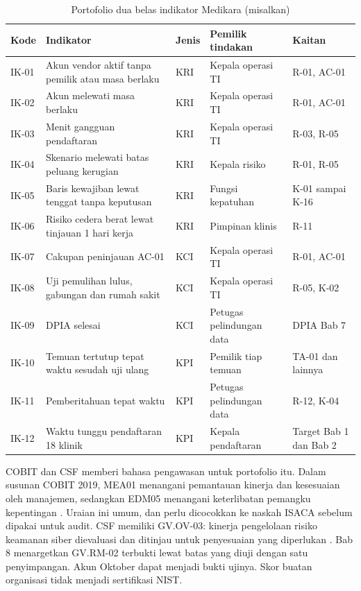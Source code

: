 \begin{table}[!htb]
  \centering\small
  \caption{Portofolio dua belas indikator Medikara (misalkan)}\label{tab:ch13-portofolio}
  \begin{tabularx}{\textwidth}{|>{\raggedright\arraybackslash}p{}|>{\raggedright\arraybackslash}X|>{\raggedright\arraybackslash}p{}|>{\raggedright\arraybackslash}p{}|>{\raggedright\arraybackslash}p{}|}
    \hline
    \textbf{Kode} & \textbf{Indikator} & \textbf{Jenis} & \textbf{Pemilik tindakan} &
    \textbf{Kaitan} \\ \hline
    IK-01 & Akun vendor aktif tanpa pemilik atau masa berlaku & KRI & Kepala operasi TI & R-01,
    AC-01 \\ \hline
    IK-02 & Akun melewati masa berlaku & KRI & Kepala operasi TI & R-01, AC-01 \\ \hline
    IK-03 & Menit gangguan pendaftaran & KRI & Kepala operasi TI & R-03, R-05 \\ \hline
    IK-04 & Skenario melewati batas peluang kerugian & KRI & Kepala risiko & R-01, R-05 \\ \hline
    IK-05 & Baris kewajiban lewat tenggat tanpa keputusan & KRI & Fungsi kepatuhan & K-01 sampai
    K-16 \\ \hline
    IK-06 & Risiko cedera berat lewat tinjauan 1 hari kerja & KRI & Pimpinan klinis & R-11 \\ \hline
    IK-07 & Cakupan peninjauan AC-01 & KCI & Kepala operasi TI & R-01, AC-01 \\ \hline
    IK-08 & Uji pemulihan lulus, gabungan dan rumah sakit & KCI & Kepala operasi TI & R-05, K-02 \\
    \hline
    IK-09 & DPIA selesai & KCI & Petugas pelindungan data & 5 DPIA Bab 7 \\ \hline
    IK-10 & Temuan tertutup tepat waktu sesudah uji ulang & KPI & Pemilik tiap temuan & TA-01 dan
    lainnya \\ \hline
    IK-11 & Pemberitahuan tepat waktu & KPI & Petugas pelindungan data & R-12, K-04 \\ \hline
    IK-12 & Waktu tunggu pendaftaran 18 klinik & KPI & Kepala pendaftaran & Target Bab 1 dan Bab 2
    \\ \hline
  \end{tabularx}
\end{table}

COBIT dan CSF memberi bahasa pengawasan untuk portofolio itu. Dalam susunan COBIT 2019, MEA01
menangani pemantauan kinerja dan kesesuaian oleh manajemen, sedangkan EDM05 menangani keterlibatan
pemangku kepentingan \cite{c04-gmo}. Uraian ini umum, dan perlu dicocokkan ke naskah ISACA sebelum
dipakai untuk audit. CSF memiliki GV.OV-03: kinerja pengelolaan risiko keamanan siber dievaluasi dan
ditinjau untuk penyesuaian yang diperlukan \cite{nistcsf2}. Bab 8 menargetkan GV.RM-02 terbukti
lewat batas yang diuji dengan satu penyimpangan. Akun Oktober dapat menjadi bukti ujinya. Skor
buatan organisasi tidak menjadi sertifikasi NIST.

